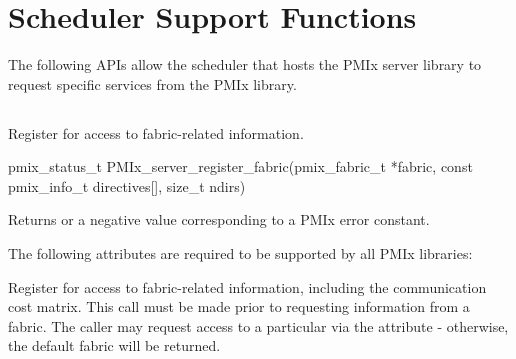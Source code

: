 %

\section{Scheduler Support Functions}

The following \acp{API} allow the scheduler that hosts the \ac{PMIx} server library to request specific services from the \ac{PMIx} library.

\subsection{}

\summary

Register for access to fabric-related information.

\format

\cspecificstart
\begin{codepar}
pmix_status_t
PMIx_server_register_fabric(pmix_fabric_t *fabric,
                            const pmix_info_t directives[],
                            size_t ndirs)
\end{codepar}
\cspecificend

\begin{arglist}
\end{arglist}

Returns  or a negative value corresponding to a \ac{PMIx} error constant.

\reqattrstart
The following attributes are required to be supported by all \ac{PMIx} libraries:


\reqattrend

\descr

Register for access to fabric-related information, including the communication cost matrix. This call must be made prior to requesting information from a fabric. The caller may request access to a particular  via the  attribute - otherwise, the default fabric will be returned.

